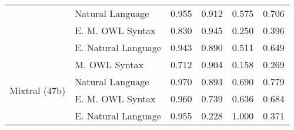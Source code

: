 \begin{table}[ht]
{\begin{tabular}{|l|l|l|l|l|l|}
 & Natural Language                               & 0.955 & 0.912 & 0.575 & 0.706 \\ \cline{2-6}
 & \cellcolor[HTML]{EFEFEF} E. M. OWL Syntax      & \cellcolor[HTML]{EFEFEF} 0.830 & \cellcolor[HTML]{EFEFEF} 0.945 & \cellcolor[HTML]{EFEFEF} 0.250 & \cellcolor[HTML]{EFEFEF} 0.396 \\ \cline{2-6}
 & E. Natural Language                            & 0.943 & 0.890 & 0.511 & 0.649 \\ \cline{1-6}
\hline
\multirow{4}{*}{Mixtral (47b)}
 & \cellcolor[HTML]{EFEFEF} M. OWL Syntax         & \cellcolor[HTML]{EFEFEF} 0.712 & \cellcolor[HTML]{EFEFEF} 0.904 & \cellcolor[HTML]{EFEFEF} 0.158 & \cellcolor[HTML]{EFEFEF} 0.269 \\ \cline{2-6}
 & Natural Language                               & 0.970 & 0.893 & 0.690 & 0.779 \\ \cline{2-6}
 & \cellcolor[HTML]{EFEFEF} E. M. OWL Syntax      & \cellcolor[HTML]{EFEFEF} 0.960 & \cellcolor[HTML]{EFEFEF} 0.739 & \cellcolor[HTML]{EFEFEF} 0.636 & \cellcolor[HTML]{EFEFEF} 0.684 \\ \cline{2-6}
 & E. Natural Language                            & 0.955 & 0.228 & 1.000 & 0.371 \\ \cline{1-6}
\hline
\end{tabular}
}
\end{table}

